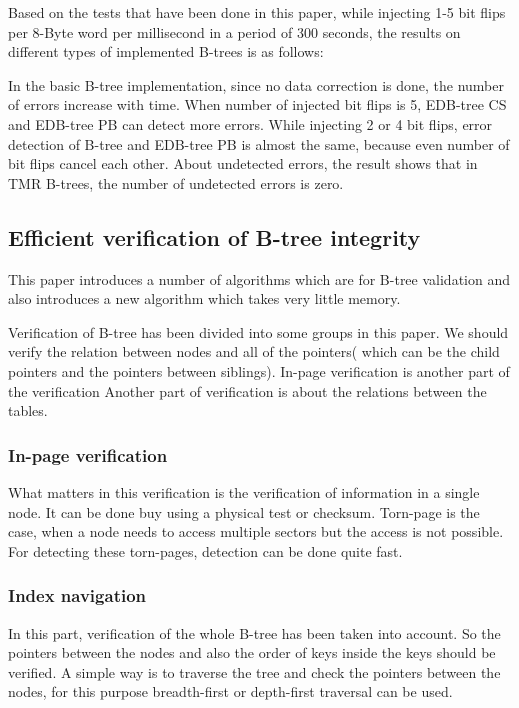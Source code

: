 \documentclass[12pt]{report}
\begin{document}
Based on the tests that have been done in this paper, while injecting 1-5 bit flips per 8-Byte word per millisecond in a period of 300 seconds, the results on different types of implemented B-trees is as follows:

In the basic B-tree implementation, since no data correction is done, the number of errors increase with time. When number of injected bit flips is 5, EDB-tree CS and EDB-tree PB can detect more errors. While injecting 2 or 4 bit flips, error detection of B-tree and EDB-tree PB is almost the same, because even number of bit flips cancel each other. About undetected errors, the result shows that in TMR B-trees, the number of undetected errors is zero.               
  

\subsection{Efficient verification of B-tree integrity \cite{Graefe}}

This paper introduces a number of algorithms which are for B-tree validation and also introduces a new algorithm which takes very little memory.

Verification of B-tree has been divided into some groups in this paper. We should verify the relation between nodes and all of the pointers( which can be the child pointers and the pointers between siblings). In-page verification is another part of the verification Another part of verification is about the relations between the tables.
  
\subsubsection{In-page verification}

What matters in this verification is the verification of information in a single node. It can be done buy using a physical test or checksum. Torn-page is the case, when a node needs to access multiple sectors but the access is not possible. For detecting these torn-pages, detection can be done quite fast.

\subsubsection{Index navigation}

In this part, verification of the whole B-tree has been taken into account. So the pointers between the nodes and also the order of keys inside the keys should be verified. A simple way is to traverse the tree and check the pointers between the nodes, for this purpose breadth-first or depth-first traversal can be used.   
\end{document}
